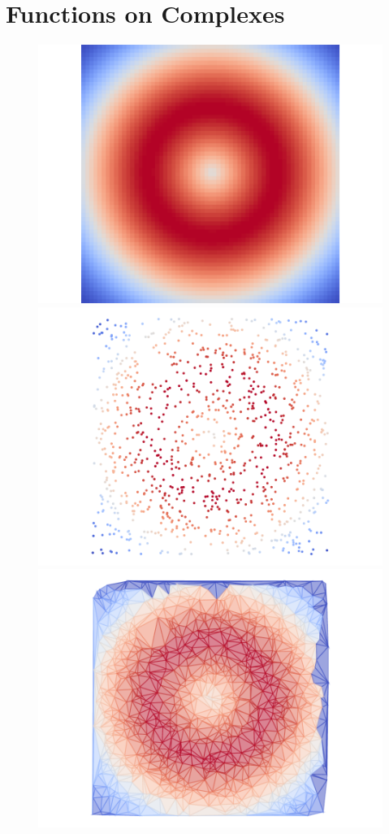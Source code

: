 \section{Functions on Complexes} %
\label{sec:functions}

\begin{figure}[htbp]
\centering
    \includegraphics[scale=0.33]{figures/fgrid.pdf}
    \includegraphics[scale=0.33]{figures/fsample.pdf}
    \includegraphics[scale=0.33]{figures/fcomplex.pdf}

\end{figure}
